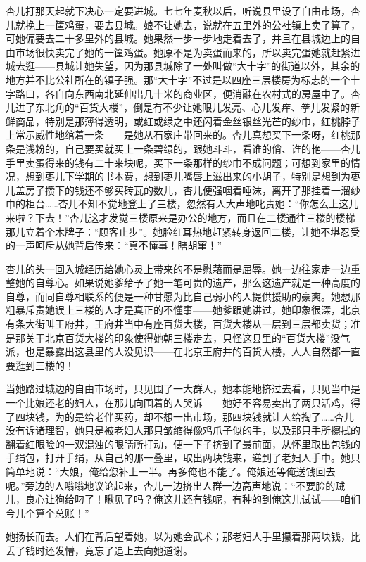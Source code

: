 \par 杏儿打那天起就下决心一定要进城。七七年麦秋以后，听说县里设了自由市场，杏儿就挽上一筐鸡蛋，要去县城。娘不让她去，说就在五里外的公社镇上卖了算了，可她偏要去二十多里外的县城。她果然一步一步地走着去了，并且在县城边上的自由市场很快卖完了她的一筐鸡蛋。她原不是为卖蛋而来的，所以卖完蛋她就赶紧进城去逛——县城让她失望，因为那县城除了一处叫做“大十字”的街道以外，其余的地方并不比公社所在的镇子强。那“大十字”不过是以四座三层楼房为标志的一个十字路口，各自向东西南北延伸出几十米的商业区，便消融在农村式的房屋中了。杏儿进了东北角的“百货大楼”，倒是有不少让她眼儿发亮、心儿发痒、拳儿发紧的新鲜商品，特别是那薄得透明，或红或绿之中还闪着金丝银丝光芒的纱巾，红桃脖子上常示威性地绾着一条——是她从石家庄带回来的。杏儿真想买下一条呀，红桃那条是浅粉的，自己要买就买上一条碧绿的，跟她斗斗，看谁的俏、谁的艳——杏儿手里卖蛋得来的钱有二十来块呢，买下一条那样的纱巾不成问题；可想到家里的情况，想到枣儿下学期的书本费，想到枣儿嘴唇上滋出来的小胡子，特别是想到为枣儿盖房子攒下的钱还不够买砖瓦的数儿，杏儿便强咽着唾沫，离开了那挂着一溜纱巾的柜台……杏儿不知不觉地登上了三楼，忽然有人大声地叱责她：“你怎么上这儿来啦？下去！”杏儿这才发觉三楼原来是办公的地方，而且在二楼通往三楼的楼梯那儿立着个木牌子：“顾客止步”。她脸红耳热地赶紧转身返回二楼，让她不堪忍受的一声呵斥从她背后传来：“真不懂事！瞎胡窜！”
\par 杏儿的头一回入城经历给她心灵上带来的不是慰藉而是屈辱。她一边往家走一边重整她的自尊心。如果说她爹给予了她一笔可贵的遗产，那么这遗产就是一种高度的自尊，而同自尊相联系的便是一种甘愿为比自己弱小的人提供援助的豪爽。她想那粗暴斥责她误上三楼的人才是真正的不懂事——她爹跟她讲过，她印象很深，北京有条大街叫王府井，王府井当中有座百货大楼，百货大楼从一层到三层都卖货；准是那关于北京百货大楼的印象使得她朝三楼走去，只怪这县里的“百货大楼”没气派，也是暴露出这县里的人没见识——在北京王府井的百货大楼，人人自然都一直要逛到三楼的！
\par 当她路过城边的自由市场时，只见围了一大群人，她本能地挤过去看，只见当中是一个比娘还老的妇人，在那儿向围着的人哭诉——她好不容易卖出了两只活鸡，得了四块钱，为的是给老伴买药，却不想一出市场，那四块钱就让人给掏了……杏儿没有诉诸理智，她只是被老妇人那只皱缩得像鸡爪子似的手，以及那只手所擦拭的翻着红眼睑的一双混浊的眼睛所打动，便一下子挤到了最前面，从怀里取出包钱的手绢包，打开手绢，从自己的那一叠里，取出两块钱来，递到了老妇人手中。她只简单地说：“大娘，俺给您补上一半。再多俺也不能了。俺娘还等俺送钱回去呢。”旁边的人嗡嗡地议论起来，杏儿一边挤出人群一边高声地说：“不要脸的贼儿，良心让狗给叼了！瞅见了吗？俺这儿还有钱呢，有种的到俺这儿试试——咱们今儿个算个总账！”
\par 她扬长而去。人们在背后望着她，以为她会武术；那老妇人手里攥着那两块钱，比丢了钱时还发懵，竟忘了追上去向她道谢。
